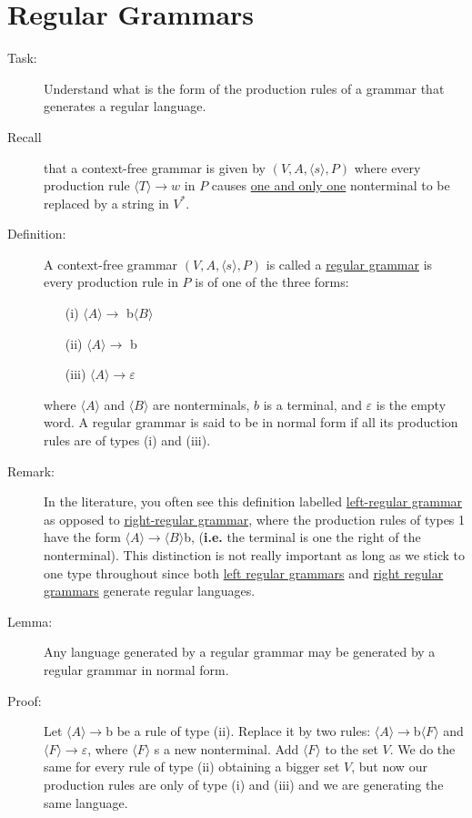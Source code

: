 \documentclass[10pt]{article}
\begin{document}
	\section{Regular Grammars}
	\begin{description}
		\item[Task:] Understand what is the form of the production rules of a grammar that generates a regular language.
		\item[Recall] that a context-free grammar is given by $(V, A, \langle s\rangle , P)$ where every production rule $\langle T\rangle  \rightarrow w$ in $P$ causes \underline{one and only one} nonterminal to be replaced by a string in $V^*$.
		\item[Definition:] A context-free grammar $(V, A, \langle s\rangle , P)$ is called a \underline{regular grammar} is every production rule in $P$ is of one of the three forms:
		\begin{enumerate}
			\item[(i)] $\langle A\rangle  \rightarrow$ b$\langle B\rangle $
			\item[(ii)] $\langle A\rangle  \rightarrow$ b
			\item[(iii)] $\langle A\rangle  \rightarrow \varepsilon$
		\end{enumerate}
		where $\langle A\rangle $ and $\langle B\rangle $ are nonterminals, $b$ is a terminal, and $\varepsilon$ is the empty word. A regular grammar is said to be in normal form if all its production rules are of types (i) and (iii).
		\item[Remark:] In the literature, you often see this definition labelled \underline{left-regular grammar} as opposed to \underline{right-regular grammar}, where the production rules of types 1 have the form $\langle A\rangle  \rightarrow \langle B\rangle $b, (\textbf{i.e.} the terminal is one the right of the nonterminal). This distinction is not really important as long as we stick to one type throughout since both \underline{left regular grammars} and \underline{right regular grammars} generate regular languages.
		\item[Lemma:] Any language generated by a regular grammar may be generated by a regular grammar in normal form.
		\item[Proof:] Let $\langle A\rangle  \rightarrow$b be a rule of type (ii). Replace it by two rules: $\langle A\rangle  \rightarrow$b$\langle F\rangle $ and $\langle F\rangle  \rightarrow \varepsilon$, where $\langle F\rangle $ s a new nonterminal. Add $\langle F\rangle $ to the set $V$. We do the same for every rule of type (ii) obtaining a bigger set $V$, but now our production rules are only of type (i) and (iii) and we are generating the same language.

\end{description}
\end{document}
